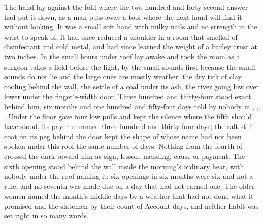 
The hand lay against the fold where the two hundred and forty-second answer had put it down, as a man puts away a tool where the next hand will find it without looking. It was a small soft hand with milky nails and no strength in the wrist to speak of; it had once reduced a shoulder in a room that smelled of disinfectant and cold metal, and had since learned the weight of a barley crust at two inches. In the small hours under  roof  lay awake and took the room as a surgeon takes a field before the light, by the small sounds first because the small sounds do not lie and the large ones are mostly weather: the dry tick of clay cooling behind the wall, the settle of a coal under its ash, the river going low over lower under the finger's-width door. Three hundred and thirty-four stood exact behind him, six months and one hundred and fifty-four days told by nobody in , , . Under the floor  gave four low pulls and kept the silence where the fifth should have stood, its payer unnamed three hundred and thirty-four days; the salt-stiff coat on its peg behind the door kept the shape of  whose name had not been spoken under this roof the same number of days. Nothing from the fourth of  crossed the dark toward him as sign, lesson, mending, cause or payment. The sixth opening stood behind the wall inside the morning's ordinary heat, with nobody under the roof naming it; six openings in six months were six and not a rule, and no seventh was made due on a day that had not earned one. The older women named the month's middle days by a weather that had not done what it promised and the slatemen by their count of Account-days, and neither habit was set right in so many words.

